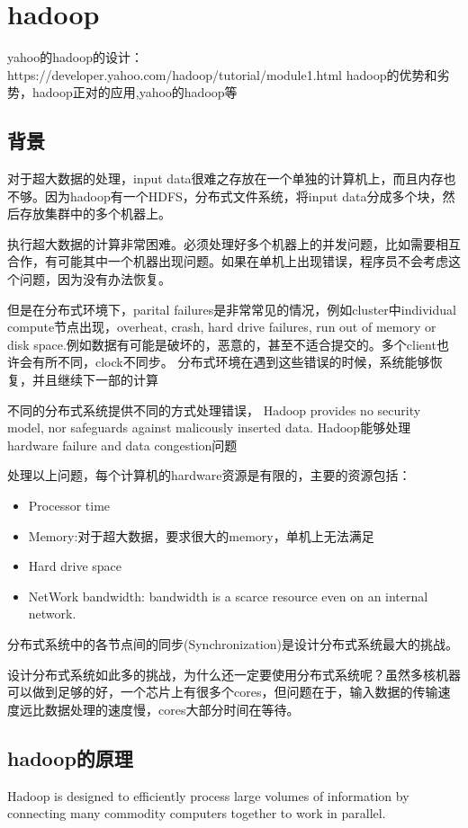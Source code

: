 \section{hadoop}
yahoo的hadoop的设计：https://developer.yahoo.com/hadoop/tutorial/module1.html
hadoop的优势和劣势，hadoop正对的应用,yahoo的hadoop等


\subsection{背景}
对于超大数据的处理，input data很难之存放在一个单独的计算机上，而且内存也不够。因为hadoop有一个HDFS，分布式文件系统，将input data分成多个块，然后存放集群中的多个机器上。

执行超大数据的计算非常困难。必须处理好多个机器上的并发问题，比如需要相互合作，有可能其中一个机器出现问题。如果在单机上出现错误，程序员不会考虑这个问题，因为没有办法恢复。

但是在分布式环境下，parital failures是非常常见的情况，例如cluster中individual compute节点出现，overheat, crash, hard drive failures, run out of memory or disk space.例如数据有可能是破坏的，恶意的，甚至不适合提交的。多个client也许会有所不同，clock不同步。
分布式环境在遇到这些错误的时候，系统能够恢复，并且继续下一部的计算

不同的分布式系统提供不同的方式处理错误，
Hadoop provides no security model, nor safeguards against malicously inserted data.
Hadoop能够处理hardware failure and data congestion问题

处理以上问题，每个计算机的hardware资源是有限的，主要的资源包括：
\begin{itemize}
  \item Processor time
  \item Memory:对于超大数据，要求很大的memory，单机上无法满足
  \item Hard drive space
  \item NetWork bandwidth: bandwidth is a scarce resource even on an internal network.
\end{itemize}

分布式系统中的各节点间的同步(Synchronization)是设计分布式系统最大的挑战。

设计分布式系统如此多的挑战，为什么还一定要使用分布式系统呢？虽然多核机器可以做到足够的好，一个芯片上有很多个cores，但问题在于，输入数据的传输速度远比数据处理的速度慢，cores大部分时间在等待。

\subsection{hadoop的原理}
Hadoop is designed to efficiently process large volumes of information by connecting many commodity computers together to work in parallel.

